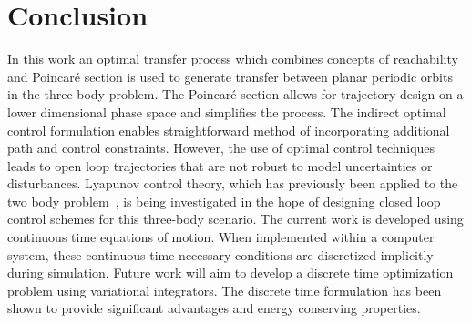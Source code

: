 \section{Conclusion}
In this work an optimal transfer process which combines concepts of reachability and Poincar\'e section is used to generate transfer between planar periodic orbits in the three body problem.
The Poincar\'e section allows for trajectory design on a lower dimensional phase space and simplifies the process.
The indirect optimal control formulation enables straightforward method of incorporating additional path and control constraints.
However, the use of optimal control techniques leads to open loop trajectories that are not robust to model uncertainties or disturbances.
Lyapunov control theory, which has previously been applied to the two body problem~\cite{chang2002}, is being investigated in the hope of designing closed loop control schemes for this three-body scenario.
The current work is developed using continuous time equations of motion. 
When implemented within a computer system, these continuous time necessary conditions are discretized implicitly during simulation.
Future work will aim to develop a discrete time optimization problem using variational integrators. 
The discrete time formulation has been shown to provide significant advantages and energy conserving properties.

